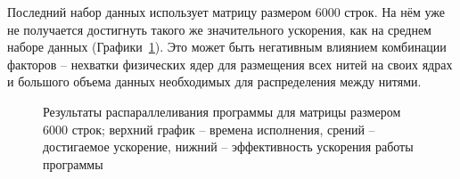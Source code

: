 \documentclass[12pt, oneside, a4paper]{article}
\begin{document}
Последний набор данных использует матрицу размером 6000 строк. На нём уже не получается достигнуть такого же значительного ускорения, как на среднем наборе данных (Графики~\ref{fig:m6000}). Это может быть негативным влиянием комбинации факторов -- нехватки физических ядер для размещения всех нитей на своих ядрах и большого объема данных необходимых для распределения между нитями.

\begin{figure}[h!]
\caption{Результаты распараллеливания программы для матрицы размером 6000 строк; верхний график -- времена исполнения, срений -- достигаемое ускорение, нижний -- эффективность ускорения работы программы}
\label{fig:m6000}
\end{figure}
\end{document}
